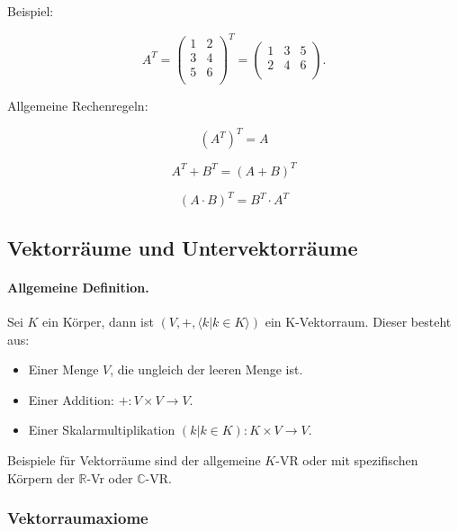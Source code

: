\documentclass{scrartcl}
\begin{document}
Beispiel:

\begin{equation}
	A^T = \begin{pmatrix*}
		1 & 2\\
		3 & 4\\
		5 & 6\\
	\end{pmatrix*}^T = \begin{pmatrix*}
		1 & 3 & 5\\
		2 & 4 & 6\\
	\end{pmatrix*}.
\end{equation}

Allgemeine Rechenregeln:

$$ (A^T)^T = A $$

$$ A^T + B^T = (A + B)^T $$

$$ (A \cdot B)^T = B^T \cdot A^T $$

\subsection{Vektorräume und Untervektorräume}

\paragraph{Allgemeine Definition.} Sei $K$ ein Körper, dann ist $(V, +, \langle k | k \in K\rangle)$ ein K-Vektorraum.
Dieser besteht aus:
\begin{itemize}
	\item Einer Menge $V$, die ungleich der leeren Menge ist.
	\item Einer Addition: $+: V\times V \rightarrow V$.
	\item Einer Skalarmultiplikation $(k|k\in K): K\times V \rightarrow V$.
\end{itemize}

Beispiele für Vektorräume sind der allgemeine $K$-VR oder mit spezifischen Körpern
der $\mathbb{R}$-Vr oder $\mathbb{C}$-VR.

\subsubsection{Vektorraumaxiome}
\end{document}
